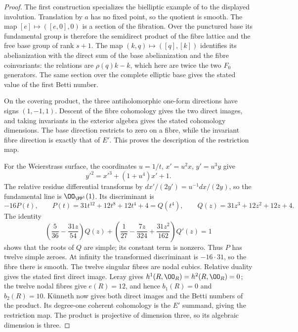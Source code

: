 \begin{proof}
The first construction specializes the bielliptic example of
\citet[Section~10.5, p.~91]{AC2026} to the displayed involution.
Translation by $a$ has no fixed point, so the quotient is smooth.
The map $[e]\mapsto([e,0],0)$ is a section of the fibration. Over
the punctured base its fundamental group is therefore the semidirect
product of the fibre lattice and the free base group of rank $s+1$.
The map $(k,q)\mapsto([q],[k])$ identifies its abelianization with
the direct sum of the base abelianization and the fibre coinvariants:
the relations are $\rho(q)k-k$, which here are twice the two
$F_0$ generators. The same section over the complete elliptic base
gives the stated value of the first Betti number.

On the covering product, the three antiholomorphic one-form
directions have signs $(1,-1,1)$. Descent of the fibre cohomology
gives the two direct images, and taking invariants in the exterior
algebra gives the stated cohomology dimensions. The base direction
restricts to zero on a fibre, while the invariant fibre direction is
exactly that of $E'$. This proves the description of the restriction
map.

For the Weierstrass surface, the coordinates $u=1/t$,
$x'=u^2x$, $y'=u^3y$ give
\[
y'^2=x'^3+(1+u^4)x'+1.
\]
The relative residue differential transforms by
$dx'/(2y')=u^{-1}dx/(2y)$, so the fundamental line is
$\OO_{\PP^1}(1)$. Its discriminant is
\[
-16P(t),\qquad P(t)=31t^{12}+12t^8+12t^4+4=Q(t^4),
\qquad Q(z)=31z^3+12z^2+12z+4.
\]
The identity
\[
\left(\frac5{36}-\frac{31z}{54}\right)Q(z)
+\left(\frac1{27}-\frac{7z}{324}+\frac{31z^2}{162}\right)Q'(z)=1
\]
shows that the roots of $Q$ are simple; its constant term is
nonzero. Thus $P$ has twelve simple zeroes. At infinity the
transformed discriminant is $-16\cdot31$, so the fibre there is
smooth. The twelve singular fibres are nodal cubics. Relative
duality gives the stated first direct image. Leray gives
$h^1(R,\OO_R)=h^2(R,\OO_R)=0$; the twelve nodal fibres give
$e(R)=12$, and hence $b_1(R)=0$ and $b_2(R)=10$.
K\"unneth now gives both direct images and the Betti numbers of
the product. Its degree-one coherent cohomology is the $E'$
summand, giving the restriction map. The product is projective
of dimension three, so its algebraic dimension is three.
\end{proof}